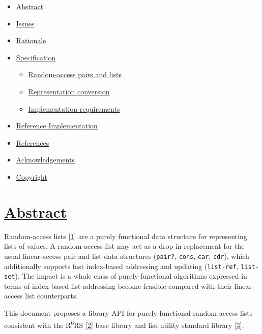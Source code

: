 \begin{itemize}
\tightlist
\item
  \protect\hyperlink{Abstract}{Abstract}
\item
  \protect\hyperlink{Issues}{Issues}
\item
  \protect\hyperlink{Rationale}{Rationale}
\item
  \protect\hyperlink{Specification}{Specification}

  \begin{itemize}
  \tightlist
  \item
    \protect\hyperlink{RandomAccessLists}{Random-access pairs and lists}
  \item
    \protect\hyperlink{RepresentationConversion}{Representation
    conversion}
  \item
    \protect\hyperlink{ImplementationRequirements}{Implementation
    requirements}
  \end{itemize}
\item
  \protect\hyperlink{ReferenceImplementation}{Reference Implementation}
\item
  \protect\hyperlink{References}{References}
\item
  \protect\hyperlink{Acknowledgements}{Acknowledgements}
\item
  \protect\hyperlink{Copyright}{Copyright}
\end{itemize}

\section{\texorpdfstring{\href{}{Abstract}}{Abstract}}\label{abstract}

Random-access lists {[}\protect\hyperlink{note-1}{1}{]} are a purely
functional data structure for representing lists of values. A
random-access list may act as a drop in replacement for the usual
linear-access pair and list data structures (\texttt{pair?},
\texttt{cons}, \texttt{car}, \texttt{cdr}), which additionally supports
fast index-based addressing and updating (\texttt{list-ref},
\texttt{list-set}). The impact is a whole class of purely-functional
algorithms expressed in terms of index-based list addressing become
feasible compared with their linear-access list counterparts.

This document proposes a library API for purely functional random-access
lists consistent with the R\textsuperscript{6}RS
{[}\protect\hyperlink{note-2}{2}{]} base library and list utility
standard library {[}\protect\hyperlink{note-3}{3}{]}.

